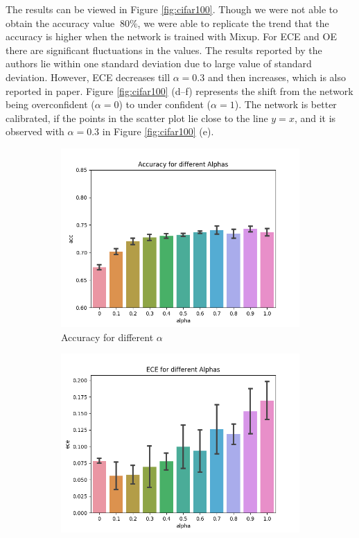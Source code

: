 \documentclass{article}
\begin{document}
The results can be viewed in Figure \ref{fig:cifar100}. Though we were not able to obtain the accuracy value $~80\%$, we were able to replicate the trend that the accuracy is higher when the network is trained with Mixup. For ECE and OE there are significant fluctuations in the values. The results reported by the authors lie within one standard deviation due to large value of standard deviation. However, ECE decreases till $\alpha=0.3$ and then increases, which is also reported in paper. Figure \ref{fig:cifar100} (d--f) represents the shift from the network being overconfident ($\alpha=0$) to under confident ($\alpha=1$). The network is better calibrated, if the points in the scatter plot lie close to the line $y=x$, and it is observed with $\alpha=0.3$ in Figure \ref{fig:cifar100} (e).
\begin{figure}[h]
     \centering
     \begin{subfigure}[b]{0.31\textwidth}
         \centering
         \includegraphics[width=\textwidth]{images/cifar/accuracyValpha.png}
         \caption{Accuracy for different $\alpha$}
     \end{subfigure}
     \begin{subfigure}[b]{0.31\textwidth}
         \centering
         \includegraphics[width=\textwidth]{images/cifar/eceValpha.png}

\end{subfigure}
\end{figure}
\end{document}
